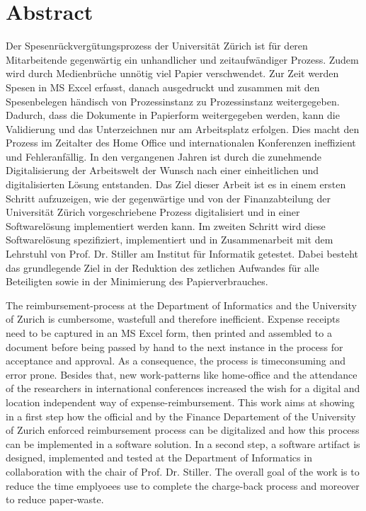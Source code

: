 \chapter*{Abstract}


Der Spesenrückvergütungsprozess der Universität Zürich ist für deren Mitarbeitende gegenwärtig ein unhandlicher und zeitaufwändiger Prozess. Zudem wird durch Medienbrüche unnötig viel Papier verschwendet. Zur Zeit werden Spesen in MS Excel erfasst, danach ausgedruckt und zusammen mit den Spesenbelegen händisch von Prozessinstanz zu Prozessinstanz weitergegeben. Dadurch, dass die Dokumente in Papierform weitergegeben werden, kann die Validierung und das Unterzeichnen nur am Arbeitsplatz erfolgen. Dies macht den Prozess im Zeitalter des Home Office und internationalen Konferenzen ineffizient und Fehleranfällig. In den vergangenen Jahren ist durch die zunehmende Digitalisierung der Arbeitswelt der Wunsch nach einer einheitlichen und digitalisierten Lösung entstanden. Das Ziel dieser Arbeit ist es in einem ersten Schritt aufzuzeigen, wie der gegenwärtige und von der Finanzabteilung der Universität Zürich vorgeschriebene Prozess digitalisiert und in einer Softwarelösung implementiert werden kann. Im zweiten Schritt wird diese Softwarelösung spezifiziert, implementiert und in Zusammenarbeit mit dem Lehrstuhl von Prof. Dr. Stiller am Institut für Informatik getestet. Dabei besteht das grundlegende Ziel in der Reduktion des zetlichen Aufwandes für alle Beteiligten sowie in der Minimierung des Papierverbrauches.


The reimbursement-process at the Department of Informatics and the University of Zurich is cumbersome, wastefull and therefore inefficient. Expense receipts need to be captured in an MS Excel form, then printed and assembled to a document before being passed by hand to the next instance in the process for acceptance and approval. As a consequence, the process is timeconsuming and error prone. Besides that, new work-patterns like home-office and the attendance of the researchers in international conferences increased the wish for a digital and location independent way of expense-reimbursement. This work aims at showing in a first step how the official and by the Finance Departement of the University of Zurich enforced reimbursement process can be digitalized and how this process can be implemented in a software solution. In a second step, a software artifact is designed, implemented and tested at the Department of Informatics in collaboration with the chair of Prof. Dr. Stiller. The overall goal of the work is to reduce the time emplyoees use to complete the charge-back process and moreover to reduce paper-waste.
